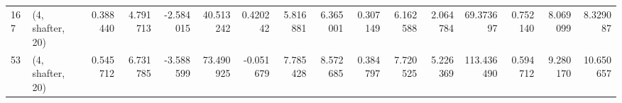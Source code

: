 \begin{tabular}{llrrrrrrrrrrrrrr}
167 &  (4, shafter, 20) &   0.388440 &   4.791713 &  -2.584015 &    40.513242 &   0.420242 &   5.816881 &   6.365001 &  0.307149 &   6.162588 &   2.064784 &     69.373697 &   0.752140 &    8.069099 &    8.329087 \\
53  &  (4, shafter, 20) &   0.545712 &   6.731785 &  -3.588599 &    73.490925 &  -0.051679 &   7.785428 &   8.572685 &  0.384797 &   7.720525 &   5.226369 &    113.436490 &   0.594712 &    9.280170 &   10.650657 \\
\bottomrule
\end{tabular}
